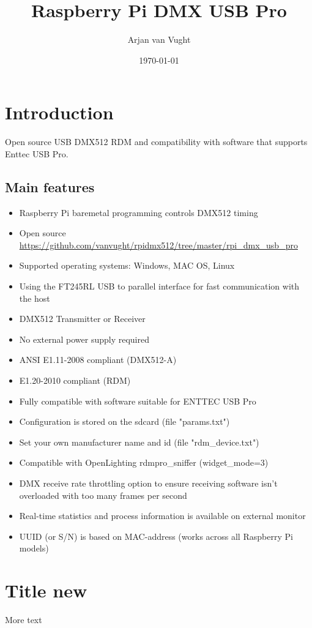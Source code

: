 \documentclass[draft,titlepage,a4paper]{article}
\title{Raspberry Pi DMX USB Pro}
\author{Arjan van Vught}
\date{\today}
\begin{document}
\maketitle

\tableofcontents

\break


\section{Introduction}

Open source USB DMX512 RDM and compatibility with software that supports Enttec USB Pro.

\subsection{Main features}

\begin{itemize}

\item Raspberry Pi baremetal programming controls DMX512 timing
\item Open source \url{https://github.com/vanvught/rpidmx512/tree/master/rpi\_dmx\_usb\_pro}
\item Supported operating systems: Windows, MAC OS, Linux
\item Using the FT245RL USB to parallel interface for fast communication with the host 
\item DMX512 Transmitter or Receiver
\item No external power supply required
\item ANSI E1.11-2008 compliant (DMX512-A)
\item E1.20-2010 compliant (RDM)
\item Fully compatible with software suitable for ENTTEC USB Pro
\item Configuration is stored on the sdcard (file "params.txt")
\item Set your own manufacturer name and id (file "rdm\_device.txt")
\item Compatible with OpenLighting rdmpro\_sniffer (widget\_mode=3)
\item DMX receive rate throttling option to ensure receiving software isn't overloaded with too many frames per second 
\item Real-time statistics and process information is available on external monitor
\item UUID (or S/N) is based on MAC-address (works across all Raspberry Pi models)
\end{itemize}

\section{Title new}

More text
\end{document}
